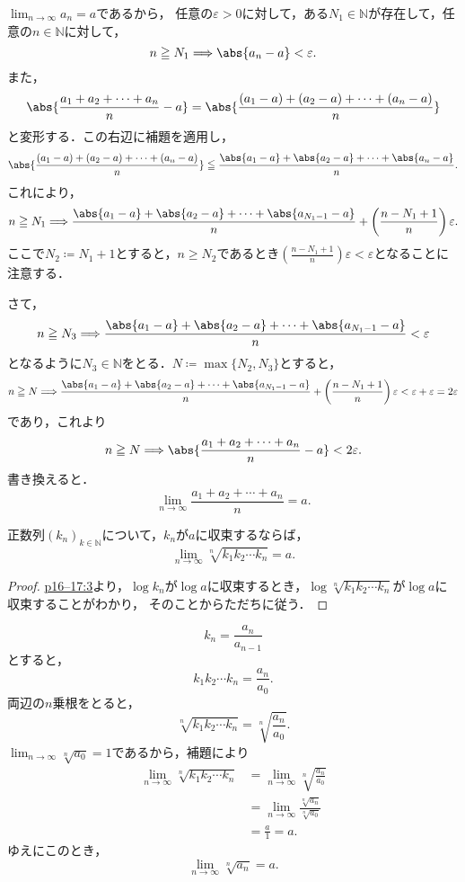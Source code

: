 \begin{tproof}
    $\lim_{n \to \infty} a_n =a$であるから，
    任意の$\varepsilon >0$に対して，ある$N_1 \in \mathbb{N}$が存在して，任意の$n \in \mathbb{N}$に対して，
    \[
        n \ge N_1 \Longrightarrow \abs{a_n -a}<\varepsilon.
    \]
    また，
    \[
        \abs{\frac{a_1+a_2+\cdots+a_n}{n}-a}= \abs{\frac{(a_1-a)+(a_2-a)+\cdots+(a_n-a)}{n}}
    \]
    と変形する．この右辺に補題を適用し，
    \[
        \abs{\frac{(a_1-a)+(a_2-a)+\cdots+(a_n-a)}{n}} \leqq \frac{\abs{a_1-a}+\abs{a_2-a}+\cdots+\abs{a_n-a}}{n}.
    \]
    これにより，
    \[
        n \ge N_1 \Longrightarrow \frac{\abs{a_1-a}+\abs{a_2-a}+\cdots+\abs{a_{N_1-1}-a}}{n} +\left( \frac{n-N_1+1}{n} \right ) \varepsilon.
    \]
    ここで$N_2 \coloneqq N_1 +1$とすると，$n \ge N_2$であるとき$\left( \frac{n-N_1+1}{n} \right ) \varepsilon < \varepsilon$となることに注意する．

    さて，
    \[
        n \ge N_3 \Longrightarrow \frac{\abs{a_1-a}+\abs{a_2-a}+\cdots+\abs{a_{N_1-1}-a}}{n}<\varepsilon
    \]
    となるように$N_3 \in \mathbb{N}$をとる．$N \coloneqq \max \{ N_2 , N_3 \}$とすると，
    \[
        n \ge N \Longrightarrow \frac{\abs{a_1-a}+\abs{a_2-a}+\cdots+\abs{a_{N_1-1}-a}}{n} +\left( \frac{n-N_1+1}{n} \right ) \varepsilon < \varepsilon + \varepsilon = 2 \varepsilon
    \]
    であり，これより
    \[
        n \ge N \Longrightarrow \abs{\frac{a_1+a_2+\cdots+a_n}{n}-a} < 2 \varepsilon.
    \]
    書き換えると．
    \[
        \lim_{n \to \infty} \frac{a_1+a_2+\cdots+a_n}{n}=a.
    \]
\end{tproof}




\begin{lemma}{}{}
    正数列$(k_n)_{k \in \mathbb{N}}$について，$k_n$が$a$に収束するならば，
    \[
    \lim_{n \to \infty} \sqrt[n]{k_1 k_2 \dotsm k_n} = a.
    \]
\end{lemma}

\begin{proof}
  \hyperref[problem:p16--17:3]{p16--17:3}より，$\log k_n$が$\log a$に収束するとき，$\log \sqrt[n]{k_1 k_2 \dotsm k_n}$が$\log a$に収束することがわかり，
  そのことからただちに従う．
\end{proof}

\begin{tproof}
\[
k_n =\frac{a_n}{a_{n-1}}
\]
とすると，
\[
k_1 k_2 \dotsm k_n = \frac{a_n}{a_0}.
\]
両辺の$n$乗根をとると，
\[
\sqrt[n]{k_1 k_2 \dotsm k_n} = \sqrt[n]{\frac{a_n}{a_0}}.
\]
$\lim_{n \to \infty} \sqrt[n]{a_0}  =1$であるから，補題により
\begin{align*}
\lim_{n \to \infty} \sqrt[n]{k_1 k_2 \dotsm k_n} &= \lim_{n \to \infty} \sqrt[n]{\frac{a_n}{a_0}} \\
&= \lim_{n \to \infty} \frac{\sqrt[n]{a_n}}{\sqrt[n]{a_0}} \\
& = \frac{a}{1} = a.
\end{align*}
ゆえにこのとき，
\[
\lim_{n \to \infty} \sqrt[n]{a_n}=a.
\]
\end{tproof}

